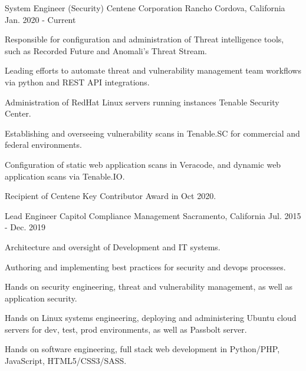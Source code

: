 

\begin{cventries}

  \cventry
    {System Engineer (Security)} %
    {Centene Corporation} %
    {Rancho Cordova, California} %
    {Jan. 2020 - Current} %
    {
      \begin{cvitems} %
        \item {Responsible for configuration and administration of Threat intelligence tools, such as Recorded Future and Anomali's Threat Stream.}
        \item {Leading efforts to automate threat and vulnerability management team workflows via python and REST API integrations.}
	      \item {Administration of RedHat Linux servers running instances Tenable Security Center.}
        \item {Establishing and overseeing vulnerability scans in Tenable.SC for commercial and federal environments.}
        \item {Configuration of static  web application scans in Veracode, and dynamic web application scans via Tenable.IO.}
        \item {Recipient of Centene Key Contributor Award in Oct 2020.}
      \end{cvitems}
    }



  \cventry
    {Lead Engineer} %
    {Capitol Compliance Management} %
    {Sacramento, California} %
    {Jul. 2015 - Dec. 2019} %
    {
      \begin{cvitems} %
        \item {Architecture and oversight of Development and IT systems.}
        \item {Authoring and implementing best practices for security and devops processes.}
        \item {Hands on security engineering, threat and vulnerability management, as well as application security.  }
        \item {Hands on Linux systems engineering, deploying and administering Ubuntu cloud servers for dev, test, prod environments, as well as Passbolt server.}
        \item {Hands on software engineering, full stack web development in Python/PHP, JavaScript, HTML5/CSS3/SASS.}
      \end{cvitems}
    }



\end{cventries}
